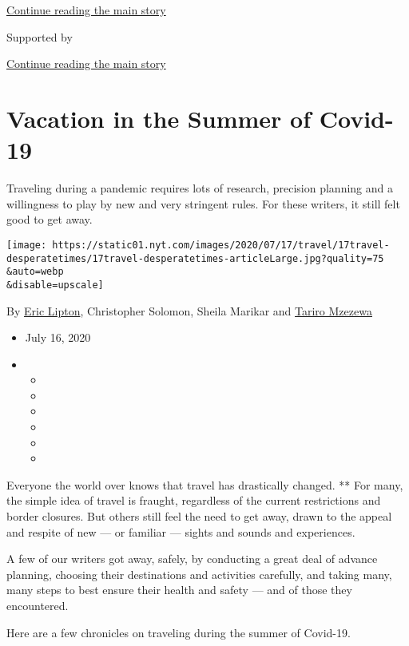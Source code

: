 \protect\hyperlink{after-top}{Continue reading the main story}

Supported by

\protect\hyperlink{after-sponsor}{Continue reading the main story}

\hypertarget{vacation-in-the-summer-of-covid-19}{%
\section{Vacation in the Summer of
Covid-19}\label{vacation-in-the-summer-of-covid-19}}

Traveling during a pandemic requires lots of research, precision
planning and a willingness to play by new and very stringent rules. For
these writers, it still felt good to get away.

\texttt{[image: https://static01.nyt.com/images/2020/07/17/travel/17travel-desperatetimes/17travel-desperatetimes-articleLarge.jpg?quality=75\\\&auto=webp\\\&disable=upscale]}

By \href{https://www.nytimes.com/by/eric-lipton}{Eric Lipton},
Christopher Solomon, Sheila Marikar and
\href{https://www.nytimes.com/by/tariro-mzezewa}{Tariro Mzezewa}

\begin{itemize}
\item
  July 16, 2020
\item
  \begin{itemize}
  \item
  \item
  \item
  \item
  \item
  \item
  \end{itemize}
\end{itemize}

Everyone the world over knows that travel has drastically changed. **
For many, the simple idea of travel is fraught, regardless of the
current restrictions and border closures. But others still feel the need
to get away, drawn to the appeal and respite of new --- or familiar ---
sights and sounds and experiences.

A few of our writers got away, safely, by conducting a great deal of
advance planning, choosing their destinations and activities carefully,
and taking many, many steps to best ensure their health and safety ---
and of those they encountered.

Here are a few chronicles on traveling during the summer of Covid-19.


